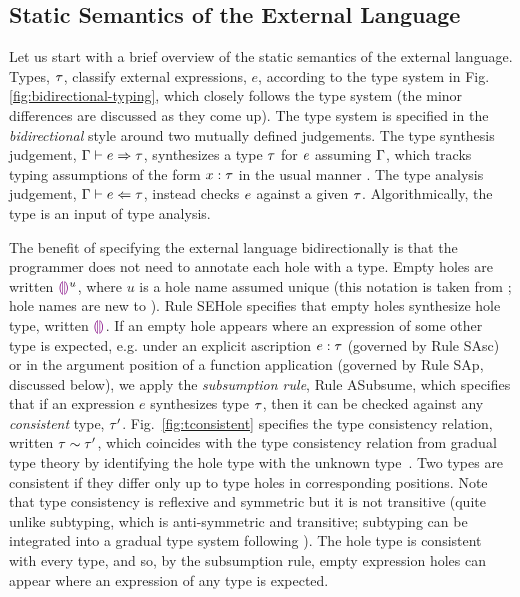 \subsection{Static Semantics of the External Language}
\label{sec:external-statics}




Let us start with a brief overview of the static semantics of the \HazelnutLive external language. Types, $\tau$, classify external expressions, $e$, according to the type system in Fig. \ref{fig:bidirectional-typing}, which closely follows the \Hazelnut type system \cite{popl-paper} (the minor differences are discussed as they come up). The type system is specified in the \emph{bidirectional} style \cite{Pierce:2000ve,bidi-tutorial,DBLP:conf/icfp/DunfieldK13,Chlipala:2005da} around two mutually defined judgements. The type synthesis judgement, $\Gamma \vdash e \Rightarrow \tau$, synthesizes a type $\tau$ for $e$ assuming $\Gamma$, which tracks typing assumptions of the form $x : \tau$ in the usual manner \cite{pfpl,tapl}. The type analysis judgement, $\Gamma \vdash e \Leftarrow \tau$, instead checks $e$ against a given $\tau$. Algorithmically, the type is an input of type analysis.%

The benefit of specifying the \HazelnutLive external language bidirectionally is that the programmer does not need to annotate each hole with a type. Empty holes are written $\textcolor{violet}{\llparenthesis}\textcolor{violet}{\rrparenthesis}^{u}$, where $u$ is a hole name assumed unique (this notation is taken from \Hazelnut; hole names are new to \HazelnutLive). Rule {SEHole} specifies that empty holes synthesize hole type, written $\textcolor{violet}{\llparenthesis}\textcolor{violet}{\rrparenthesis}$. If an empty hole appears where an expression of some other type is expected, e.g. under an explicit ascription $e : \tau$ (governed by Rule {SAsc}) or in the argument position of a function application (governed by Rule {SAp}, discussed below), we apply the \emph{subsumption rule}, Rule {ASubsume}, which specifies that if an expression $e$ synthesizes type $\tau$, then it can be checked against any \emph{consistent} type, $\tau'$. Fig.~\ref{fig:tconsistent} specifies the type consistency relation, written $\tau \sim \tau'$, which coincides with the type consistency relation from gradual type theory by identifying the hole type with the unknown type~\cite{Siek06a}. Two types are consistent if they differ only up to type holes in corresponding positions. Note that type consistency is reflexive and symmetric but it is not transitive (quite unlike subtyping, which is anti-symmetric and transitive; subtyping can be integrated into a gradual type system following \citet{Siek:2007qy}). The hole type is consistent with every type, and so, by the subsumption rule, empty expression holes can appear where an expression of any type is expected.

